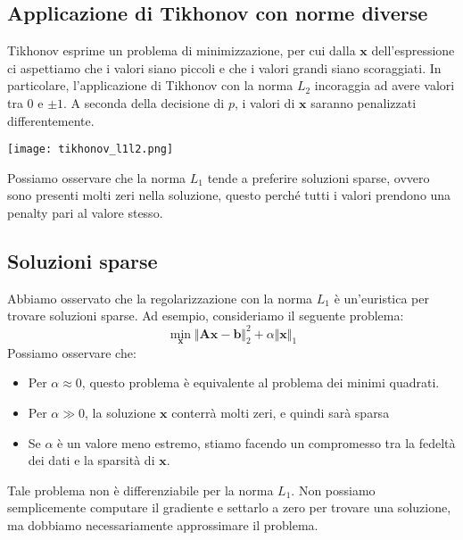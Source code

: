 \documentclass{article}
\begin{document}
        \subsection{Applicazione di Tikhonov con norme diverse}
            Tikhonov esprime un problema di minimizzazione, per cui dalla $\mathbf{x}$ dell'espressione ci aspettiamo che i valori 
            siano piccoli e che i valori grandi siano scoraggiati. In particolare, l'applicazione di Tikhonov con la norma $L_2$ incoraggia 
            ad avere valori tra $0$ e $\pm1$. A seconda della decisione di $p$, i valori di $\mathbf{x}$ saranno penalizzati differentemente.
            \begin{center}\texttt{[image: tikhonov\_l1l2.png]}\end{center}
            Possiamo osservare che la norma $L_1$ tende a preferire soluzioni sparse, ovvero sono presenti molti zeri nella soluzione, questo 
            perché tutti i valori prendono una penalty pari al valore stesso.
        
        \subsection{Soluzioni sparse}
            Abbiamo osservato che la regolarizzazione con la norma $L_1$ è un'euristica per trovare soluzioni sparse. Ad esempio, consideriamo 
            il seguente problema:
            \[\min_\mathbf{x} \Vert \mathbf{Ax} - \mathbf{b} \Vert_2^2 + \alpha \Vert \mathbf{x} \Vert_1 \]
            Possiamo osservare che:
            \begin{itemize}
                \item Per $\alpha \approx 0$, questo problema è equivalente al problema dei minimi quadrati.
                \item Per $\alpha \gg 0$, la soluzione $\mathbf{x}$ conterrà molti zeri, e quindi sarà sparsa
                \item Se $\alpha$ è un valore meno estremo, stiamo facendo un compromesso tra la fedeltà dei dati e la sparsità di $\mathbf{x}$. 
            \end{itemize}
            Tale problema non è differenziabile per la norma $L_1$. Non possiamo semplicemente computare il gradiente e settarlo a zero 
            per trovare una soluzione, ma dobbiamo necessariamente approssimare il problema.
\end{document}
